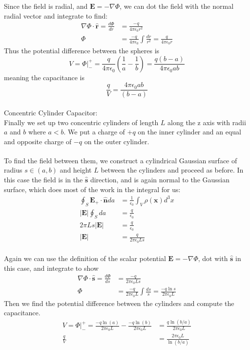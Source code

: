 \documentclass{article}
\begin{document}
Since the field is radial, and $\mathbf{E}=-\nabla\Phi$, we can dot the field with the normal radial vector and integrate to find:
\begin{align*}
\nabla\Phi\cdot\mathbf{\hat{r}} = \frac{d\Phi}{dr} &= \frac{-q}{4\pi\epsilon_{0}r^{2}}\\
\Phi &= \frac{-q}{4\pi\epsilon_{0}}\int\frac{dr}{r^{2}} = \frac{q}{4\pi\epsilon_{0}r}
\end{align*}
Thus the potential difference between the spheres is
\[ V = \Phi\rvert_{-}^{+} = \frac{q}{4\pi\epsilon_{0}}\left(\frac{1}{a}-\frac{1}{b}\right) = \frac{q(b-a)}{4\pi\epsilon_{0}ab} \]
meaning the capacitance is
\[ \frac{q}{V} = \boxed{\frac{4\pi\epsilon_{0}ab}{(b-a)}} \]
\\
Concentric Cylinder Capacitor:\\
Finally we set up two concentric cylinders of length $L$ along the z axis with radii $a$ and $b$ where $a<b$. We put a charge of $+q$ on the inner cylinder and an equal and opposite charge of $-q$ on the outer cylinder.\\
\\
To find the field between them, we construct a cylindrical Gaussian surface of radius $s\in(a,b)$ and height $L$ between the cylinders and proceed as before. In this case the field is in the $\mathbf{\hat{s}}$ direction, and is again normal to the Gaussian surface, which does most of the work in the integral for us:
\begin{align*}
\oint_{S} \mathbf{E}_{+}\cdot \mathbf{\hat{n}} da &= \frac{1}{\epsilon_{0}} \int_{V} \rho(\mathbf{x}) d^{3}x\\
\left|\mathbf{E}\right|\oint_{S}da &= \frac{q}{\epsilon_{0}}\\
2\pi Ls\left|\mathbf{E}\right| &= \frac{q}{\epsilon_{0}}\\
\left|\mathbf{E}\right| &= \frac{q}{2\pi\epsilon_{0}Ls}
\end{align*}
\\
Again we can use the definition of the scalar potential $\mathbf{E}=-\nabla\Phi$, dot with $\mathbf{\hat{s}}$ in this case, and integrate to show
\begin{align*}
\nabla\Phi\cdot\mathbf{\hat{s}} = \frac{d\Phi}{ds} &= \frac{-q}{2\pi\epsilon_{0}Ls}\\
\Phi &= \frac{-q}{2\pi\epsilon_{0}L}\int \frac{ds}{s} = \frac{-q\ln s}{2\pi\epsilon_{0}L}
\end{align*}
Then we find the potential difference between the cylinders and compute the capacitance.
\begin{align*}
V = \Phi\rvert_{-}^{+} = \frac{-q\ln (a)}{2\pi\epsilon_{0}L}-\frac{-q\ln (b)}{2\pi\epsilon_{0}L} &= \frac{q\ln (b/a)}{2\pi\epsilon_{0}L}\\
\frac{q}{V} &= \boxed{\frac{2\pi\epsilon_{0}L}{\ln (b/a)}}
\end{align*}
\end{document}
